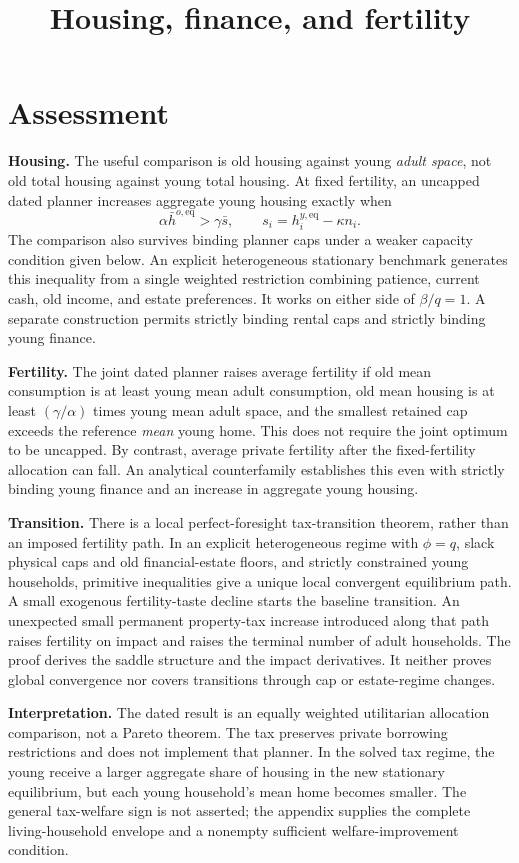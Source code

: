 \documentclass[11pt]{article}
\title{Housing, finance, and fertility}
\author{}
\date{}
\newcommand{\eq}{\mathrm{eq}}
\begin{document}
\maketitle
\vspace{-2em}
\section*{Assessment}
\textbf{Housing.} The useful comparison is old housing against young \emph{adult space}, not old total housing against young total housing. At fixed fertility, an uncapped dated planner increases aggregate young housing exactly when
\[
\alpha\bar h^{o,\eq}>\gamma\bar s,\qquad s_i=h_i^{y,\eq}-\kappa n_i.
\]
The comparison also survives binding planner caps under a weaker capacity condition given below. An explicit heterogeneous stationary benchmark generates this inequality from a single weighted restriction combining patience, current cash, old income, and estate preferences. It works on either side of $\beta/q=1$. A separate construction permits strictly binding rental caps and strictly binding young finance.

\textbf{Fertility.} The joint dated planner raises average fertility if old mean consumption is at least young mean adult consumption, old mean housing is at least $(\gamma/\alpha)$ times young mean adult space, and the smallest retained cap exceeds the reference \emph{mean} young home. This does not require the joint optimum to be uncapped. By contrast, average private fertility after the fixed-fertility allocation can fall. An analytical counterfamily establishes this even with strictly binding young finance and an increase in aggregate young housing.

\textbf{Transition.} There is a local perfect-foresight tax-transition theorem, rather than an imposed fertility path. In an explicit heterogeneous regime with $\phi=q$, slack physical caps and old financial-estate floors, and strictly constrained young households, primitive inequalities give a unique local convergent equilibrium path. A small exogenous fertility-taste decline starts the baseline transition. An unexpected small permanent property-tax increase introduced along that path raises fertility on impact and raises the terminal number of adult households. The proof derives the saddle structure and the impact derivatives. It neither proves global convergence nor covers transitions through cap or estate-regime changes.

\textbf{Interpretation.} The dated result is an equally weighted utilitarian allocation comparison, not a Pareto theorem. The tax preserves private borrowing restrictions and does not implement that planner. In the solved tax regime, the young receive a larger aggregate share of housing in the new stationary equilibrium, but each young household's mean home becomes smaller. The general tax-welfare sign is not asserted; the appendix supplies the complete living-household envelope and a nonempty sufficient welfare-improvement condition.
\end{document}
